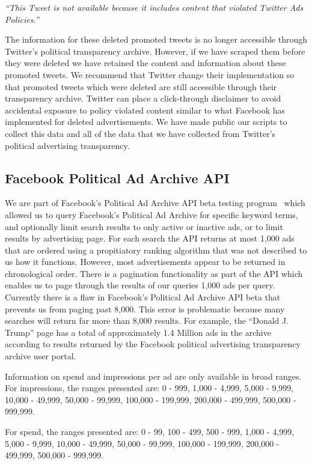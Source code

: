 \documentclass[fleqn,10pt]{wlscirep}
\begin{document}
\noindent\textit{``This Tweet is not available because it includes content that violated Twitter Ads Policies.''}

The information for these deleted promoted tweets is no longer accessible through Twitter's political transparency archive. However, if we have scraped them before they were deleted we have retained the content and information about these promoted tweets. We recommend that Twitter change their implementation so that promoted tweets which were deleted are still accessible through their transparency archive. Twitter can place a click-through disclaimer to avoid accidental exposure to policy violated content similar to what Facebook has implemented for deleted advertisements. We have made public our scripts to collect this data and all of the data that we have collected from Twitter's political advertising transparency.


\subsection*{Facebook Political Ad Archive API}
We are part of Facebook's Political Ad Archive API beta testing program~\cite{FB_Api} which allowed us to query Facebook's Political Ad Archive for specific keyword terms, and optionally limit search results to only active or inactive ads, or to limit results by advertising page. For each search the API returns at most 1,000 ads that are ordered using a propitiatory ranking algorithm that was not described to us how it functions. However, most advertisements appear to be returned in chronological order. There is a pagination functionality as part of the API which enables us to page through the results of our queries 1,000 ads per query. Currently there is a flaw in Facebook's Political Ad Archive API beta that prevents us from paging past 8,000. This error is problematic because many searches will return far more than 8,000 results. For example, the ``Donald J. Trump'' page has a total of approximately 1.4 Million ads in the archive according to results returned by the Facebook political advertising transparency archive user portal. 

Information on spend and impressions per ad are only available in broad ranges. For impressions, the ranges presented are:
     0 - 999, 1,000 - 4,999, 5,000 - 9,999, 10,000 - 49,999, 50,000 - 99,999, 100,000 - 199,999, 200,000 - 499,999, 500,000 - 999,999.
     
For spend, the ranges presented are:
    0 - 99, 100 - 499, 500 - 999, 1,000 - 4,999, 5,000 - 9,999, 10,000 - 49,999, 50,000 - 99,999, 100,000 - 199,999, 200,000 - 499,999, 500,000 - 999,999.
    
\end{document}
